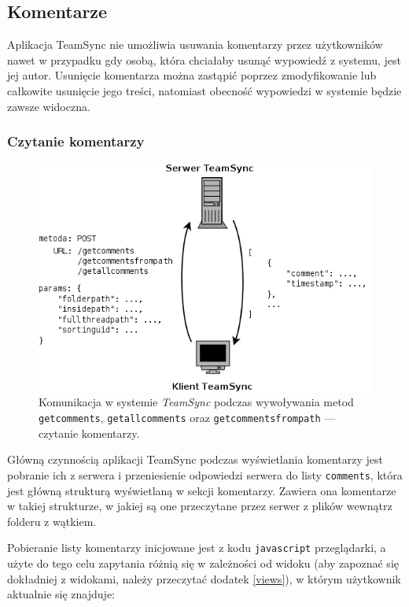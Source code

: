 \documentclass[polish,a4paper,twoside]{ppfcmthesis}
\begin{document}
\subsection{Komentarze}

\label{comments}

Aplikacja TeamSync nie umożliwia usuwania komentarzy przez użytkowników nawet w przypadku gdy osobą, która chciałaby usunąć wypowiedź z systemu, jest jej autor. Usunięcie komentarza można zastąpić poprzez zmodyfikowanie lub całkowite usunięcie jego treści, natomiast obecność wypowiedzi w systemie będzie zawsze widoczna.

\subsubsection*{Czytanie komentarzy}

\begin{figure}[h!]
  \vspace{5pt}
  \begin{center}
    \includegraphics[width=320pt]{figures/metgetcomments.png}
  \end{center}
  \caption{Komunikacja w systemie \emph{TeamSync} podczas wywoływania metod \texttt{getcomments}, \texttt{getallcomments} oraz \texttt{getcommentsfrompath} --- czytanie komentarzy.}
  \label{picmetdeletefolder}
\end{figure}

Główną czynnością aplikacji TeamSync podczas wyświetlania komentarzy jest pobranie ich z serwera i przeniesienie odpowiedzi serwera do listy \texttt{comments}, która jest główną strukturą wyświetlaną w sekcji komentarzy. Zawiera ona komentarze w takiej strukturze, w jakiej są one przeczytane przez serwer z plików wewnątrz folderu z wątkiem.

Pobieranie listy komentarzy inicjowane jest z kodu \texttt{javascript} przeglądarki, a użyte do tego celu zapytania różnią się w zależności od widoku (aby zapoznać się dokładniej z widokami, należy przeczytać dodatek \ref{views}), w którym użytkownik aktualnie się znajduje:
\end{document}
